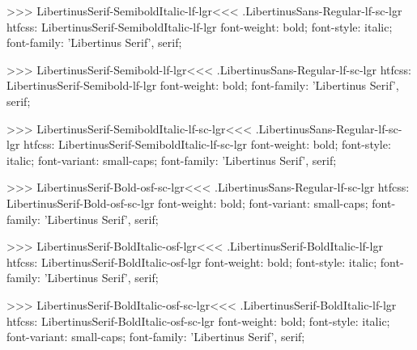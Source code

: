 >>>
\<LibertinusSerif-SemiboldItalic-lf-lgr\><<<
.LibertinusSans-Regular-lf-sc-lgr
htfcss:  LibertinusSerif-SemiboldItalic-lf-lgr  font-weight: bold; font-style: italic; font-family: 'Libertinus Serif', serif;

>>>
\<LibertinusSerif-Semibold-lf-lgr\><<<
.LibertinusSans-Regular-lf-sc-lgr
htfcss:  LibertinusSerif-Semibold-lf-lgr  font-weight: bold; font-family: 'Libertinus Serif', serif;

>>>
\<LibertinusSerif-SemiboldItalic-lf-sc-lgr\><<<
.LibertinusSans-Regular-lf-sc-lgr
htfcss:  LibertinusSerif-SemiboldItalic-lf-sc-lgr  font-weight: bold; font-style: italic; font-variant: small-caps; font-family: 'Libertinus Serif', serif;

>>>
\<LibertinusSerif-Bold-osf-sc-lgr\><<<
.LibertinusSans-Regular-lf-sc-lgr
htfcss:  LibertinusSerif-Bold-osf-sc-lgr  font-weight: bold; font-variant: small-caps; font-family: 'Libertinus Serif', serif;

>>>
\<LibertinusSerif-BoldItalic-osf-lgr\><<<
.LibertinusSerif-BoldItalic-lf-lgr
htfcss:  LibertinusSerif-BoldItalic-osf-lgr  font-weight: bold; font-style: italic; font-family: 'Libertinus Serif', serif;

>>>
\<LibertinusSerif-BoldItalic-osf-sc-lgr\><<<
.LibertinusSerif-BoldItalic-lf-lgr
htfcss:  LibertinusSerif-BoldItalic-osf-sc-lgr  font-weight: bold; font-style: italic; font-variant: small-caps; font-family: 'Libertinus Serif', serif;

